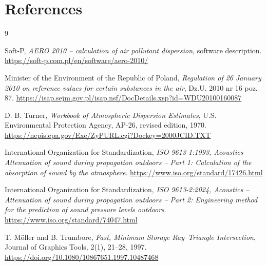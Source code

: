 \documentclass[11pt,a4paper]{article}
\begin{document}
\section{References}

\begin{thebibliography}{9}

Soft-P,
\emph{AERO 2010 -- calculation of air pollutant dispersion},
software description.
\url{https://soft-p.com.pl/en/software/aero-2010/}

Minister of the Environment of the Republic of Poland,
\emph{Regulation of 26 January 2010 on reference values for certain substances
in the air},
Dz.U. 2010 nr 16 poz. 87.
\url{https://isap.sejm.gov.pl/isap.nsf/DocDetails.xsp?id=WDU20100160087}

D. B. Turner,
\emph{Workbook of Atmospheric Dispersion Estimates},
U.S. Environmental Protection Agency, AP-26, revised edition, 1970.
\url{https://nepis.epa.gov/Exe/ZyPURL.cgi?Dockey=2000JCID.TXT}

International Organization for Standardization,
\emph{ISO 9613-1:1993, Acoustics -- Attenuation of sound during propagation
outdoors -- Part 1: Calculation of the absorption of sound by the atmosphere}.
\url{https://www.iso.org/standard/17426.html}

International Organization for Standardization,
\emph{ISO 9613-2:2024, Acoustics -- Attenuation of sound during propagation
outdoors -- Part 2: Engineering method for the prediction of sound pressure
levels outdoors}.
\url{https://www.iso.org/standard/74047.html}

T. M\"oller and B. Trumbore,
\emph{Fast, Minimum Storage Ray--Triangle Intersection},
Journal of Graphics Tools, 2(1), 21--28, 1997.
\url{https://doi.org/10.1080/10867651.1997.10487468}

\end{thebibliography}
\end{document}
